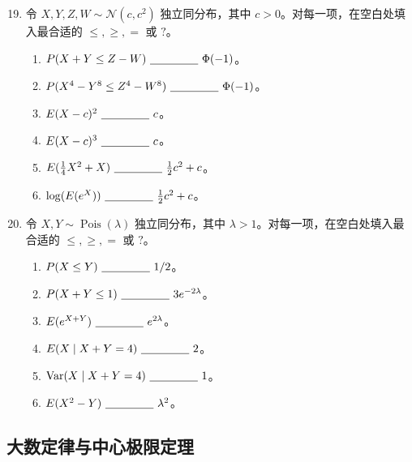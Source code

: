 \documentclass[UTF8, 12pt, fontset=fandol, oneside]{ctexart}
\begin{document}
\begin{enumerate}
  \setcounter{enumi}{18}
  \item 令 $X,Y,Z,W\sim\mathcal N(c,c^2)$ 独立同分布，其中 $c>0$。对每一项，在空白处填入最合适的 $\le,\ge,=$ 或 $?$。
  \begin{enumerate}
    \item $P(X+Y\le Z-W)\ \underline{\hspace{1.5cm}}\ \Phi(-1)$。
    \item $P(X^4-Y^8\le Z^4-W^8)\ \underline{\hspace{1.5cm}}\ \Phi(-1)$。
    \item $E(X-c)^2\ \underline{\hspace{1.5cm}}\ c$。
    \item $E(X-c)^3\ \underline{\hspace{1.5cm}}\ c$。
    \item $E(\frac14X^2+X)\ \underline{\hspace{1.5cm}}\ \frac12c^2+c$。
    \item $\log(E(e^X))\ \underline{\hspace{1.5cm}}\ \frac12c^2+c$。
  \end{enumerate}

  \item 令 $X,Y\sim\operatorname{Pois}(\lambda)$ 独立同分布，其中 $\lambda>1$。对每一项，在空白处填入最合适的 $\le,\ge,=$ 或 $?$。
  \begin{enumerate}
    \item $P(X\le Y)\ \underline{\hspace{1.5cm}}\ 1/2$。
    \item $P(X+Y\le 1)\ \underline{\hspace{1.5cm}}\ 3e^{-2\lambda}$。
    \item $E(e^{X+Y})\ \underline{\hspace{1.5cm}}\ e^{2\lambda}$。
    \item $E(X\mid X+Y=4)\ \underline{\hspace{1.5cm}}\ 2$。
    \item $\operatorname{Var}(X\mid X+Y=4)\ \underline{\hspace{1.5cm}}\ 1$。
    \item $E(X^2-Y)\ \underline{\hspace{1.5cm}}\ \lambda^2$。
  \end{enumerate}
\end{enumerate}

\subsection*{大数定律与中心极限定理}
\end{document}
